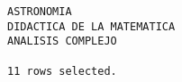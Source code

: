 \documentclass[11pt]{report}
\begin{document}
\begin{itemize}
\begin{verbatim}
ASTRONOMIA                                                                                                                                                                                                                                                                                                                                                                                                                                                                                                          
DIDACTICA DE LA MATEMATICA                                                                                                                                                                                                                                                                                                                                                                                                                                                                                          
ANALISIS COMPLEJO                                                                                                                                                                                                                                                                                                                                                                                                                                                                                                   

11 rows selected.
  \end{verbatim}
\end{itemize}

\end{document}
